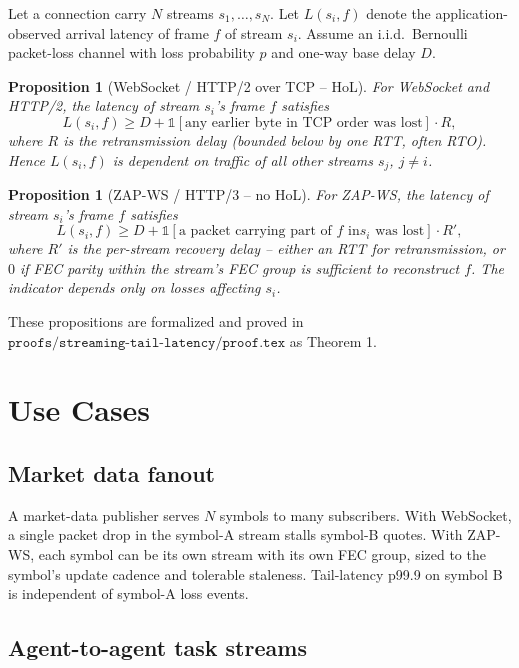 \documentclass[11pt,a4paper]{article}
\newtheorem{proposition}[theorem]{Proposition}
\begin{document}
Let a connection carry $N$ streams $s_1, \ldots, s_N$. Let
$L(s_i, f)$ denote the application-observed arrival latency of frame $f$
of stream $s_i$. Assume an i.i.d.\ Bernoulli packet-loss channel with
loss probability $p$ and one-way base delay $D$.

\begin{proposition}[WebSocket / HTTP/2 over TCP -- HoL]
For WebSocket and HTTP/2, the latency of stream $s_i$'s frame $f$
satisfies
\[
L(s_i, f) \ge D + \mathbb{1}[\text{any earlier byte in TCP order was
lost}] \cdot R,
\]
where $R$ is the retransmission delay (bounded below by one RTT, often
RTO). Hence $L(s_i, f)$ is dependent on traffic of all other streams
$s_j$, $j \ne i$.
\end{proposition}

\begin{proposition}[ZAP-WS / HTTP/3 -- no HoL]
For ZAP-WS, the latency of stream $s_i$'s frame $f$ satisfies
\[
L(s_i, f) \ge D + \mathbb{1}[\text{a packet carrying part of $f$ in
$s_i$ was lost}] \cdot R',
\]
where $R'$ is the per-stream recovery delay -- either an RTT for
retransmission, or $0$ if FEC parity within the stream's FEC group is
sufficient to reconstruct $f$. The indicator depends only on losses
affecting $s_i$.
\end{proposition}

These propositions are formalized and proved in
$\texttt{proofs/streaming-tail-latency/proof.tex}$ as Theorem 1.

\section{Use Cases}

\subsection{Market data fanout}

A market-data publisher serves $N$ symbols to many subscribers. With
WebSocket, a single packet drop in the symbol-A stream stalls symbol-B
quotes. With ZAP-WS, each symbol can be its own stream with its own FEC
group, sized to the symbol's update cadence and tolerable staleness.
Tail-latency p99.9 on symbol B is independent of symbol-A loss events.

\subsection{Agent-to-agent task streams}
\end{document}
